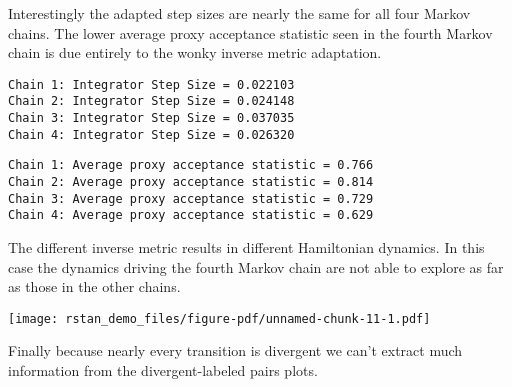 \documentclass[
  letterpaper,
  DIV=11,
  numbers=noendperiod]{scrartcl}
\newenvironment{Shaded}{\begin{snugshade}}{\end{snugshade}}
\newcommand{\FunctionTok}[1]{\textcolor[rgb]{0.28,0.35,0.67}{#1}}
\newcommand{\NormalTok}[1]{\textcolor[rgb]{0.00,0.23,0.31}{#1}}
\newcommand{\SpecialCharTok}[1]{\textcolor[rgb]{0.37,0.37,0.37}{#1}}
\begin{document}
Interestingly the adapted step sizes are nearly the same for all four
Markov chains. The lower average proxy acceptance statistic seen in the
fourth Markov chain is due entirely to the wonky inverse metric
adaptation.

\begin{Shaded}
\end{Shaded}

\begin{verbatim}
Chain 1: Integrator Step Size = 0.022103
Chain 2: Integrator Step Size = 0.024148
Chain 3: Integrator Step Size = 0.037035
Chain 4: Integrator Step Size = 0.026320
\end{verbatim}

\begin{Shaded}
\end{Shaded}

\begin{verbatim}
Chain 1: Average proxy acceptance statistic = 0.766
Chain 2: Average proxy acceptance statistic = 0.814
Chain 3: Average proxy acceptance statistic = 0.729
Chain 4: Average proxy acceptance statistic = 0.629
\end{verbatim}

The different inverse metric results in different Hamiltonian dynamics.
In this case the dynamics driving the fourth Markov chain are not able
to explore as far as those in the other chains.

\begin{Shaded}
\end{Shaded}

\texttt{[image: rstan\_demo\_files/figure-pdf/unnamed-chunk-11-1.pdf]}

Finally because nearly every transition is divergent we can't extract
much information from the divergent-labeled pairs plots.
\end{document}
